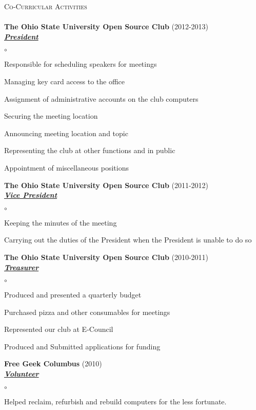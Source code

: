 \documentclass{article}
\newcommand{\lineunder}{\vspace*{-8pt} \\ \hspace*{-18pt} \hrulefill \\}
\newcommand{\header}[1]{{\hspace*{-15pt}\vspace*{6pt} \textsc{#1}} \vspace*{-6pt} \lineunder}
\newcommand{\organization}[3]{{ \textbf{#1} (#2)\\ \underline{\textbf{\emph{#3}}}\\  }}
\newenvironment{achievements}{\begin{list}{$\circ$}{\topsep 0pt \itemsep -2pt}}{\vspace*{4pt}\end{list}}
\begin{document}
\header{Co-Curricular Activities}
\organization{The Ohio State University Open Source Club}{2012-2013}{President}
	\begin{achievements}
	\item Responsible for scheduling speakers for meetings
	\item Managing key card access to the office
	\item Assignment of administrative accounts on the club computers
	\item Securing the meeting location
	\item Announcing meeting location and topic
	\item Representing the club at other functions and in public
	\item Appointment of miscellaneous positions
	\end{achievements}

\organization{The Ohio State University Open Source Club}{2011-2012}{Vice President}
	\begin{achievements}
	\item Keeping the minutes of the meeting
	\item Carrying out the duties of the President when the President is unable to do so
	\end{achievements}

\organization{The Ohio State University Open Source Club}{2010-2011}{Treasurer}
	\begin{achievements}
	\item Produced and presented a quarterly budget
	\item Purchased pizza and other consumables for meetings
	\item Represented our club at E-Council
	\item Produced and Submitted applications for funding	
	\end{achievements}

\organization{Free Geek Columbus}{2010}{Volunteer}
	\begin{achievements}
	\item Helped reclaim, refurbish and rebuild computers for the less fortunate.
	\end{achievements}
\end{document}
